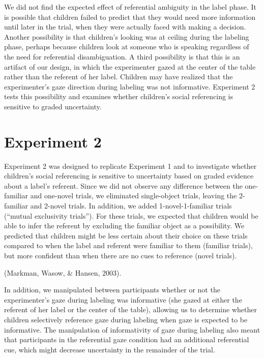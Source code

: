 \documentclass[10pt, letterpaper]{article}
\begin{document}
We did not find the expected effect of referential ambiguity in the
label phase. It is possible that children failed to predict that they
would need more information until later in the trial, when they were
actually faced with making a decision. Another possibility is that
children's looking was at ceiling during the labeling phase, perhaps
because children look at someone who is speaking regardless of the need
for referential disambiguation. A third possibility is that this is an
artifact of our design, in which the experimenter gazed at the center of
the table rather than the referent of her label. Children may have
realized that the experimenter's gaze direction during labeling was not
informative. Experiment 2 tests this possibility and examines whether
children's social referencing is sensitive to graded uncertainty.

\section{Experiment 2}\label{experiment-2}

Experiment 2 was designed to replicate Experiment 1 and to investigate
whether children's social referencing is sensitive to uncertainty based
on graded evidence about a label's referent. Since we did not observe
any difference between the one-familiar and one-novel trials, we
eliminated single-object trials, leaving the 2-familiar and 2-novel
trials. In addition, we added 1-novel-1-familiar trials (``mutual
exclusivity trials''). For these trials, we expected that children would
be able to infer the referent by excluding the familiar object as a
possibility. We predicted that children might be less certain about
their choice on these trials compared to when the label and referent
were familiar to them (familiar trials), but more confident than when
there are no cues to reference (novel trials).

(Markman, Wasow, \& Hansen, 2003).

In addition, we manipulated between participants whether or not the
experimenter's gaze during labeling was informative (she gazed at either
the referent of her label or the center of the table), allowing us to
determine whether children selectively reference gaze during labeling
when gaze is expected to be informative. The manipulation of
informativity of gaze during labeling also meant that participants in
the referential gaze condition had an additional referential cue, which
might decrease uncertainty in the remainder of the trial.
\end{document}
